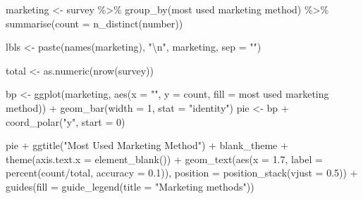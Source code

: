 \documentclass[
]{article}
\newenvironment{Shaded}{\begin{snugshade}}{\end{snugshade}}
\newcommand{\AttributeTok}[1]{\textcolor[rgb]{0.77,0.63,0.00}{#1}}
\newcommand{\DecValTok}[1]{\textcolor[rgb]{0.00,0.00,0.81}{#1}}
\newcommand{\FloatTok}[1]{\textcolor[rgb]{0.00,0.00,0.81}{#1}}
\newcommand{\FunctionTok}[1]{\textcolor[rgb]{0.00,0.00,0.00}{#1}}
\newcommand{\NormalTok}[1]{#1}
\newcommand{\OtherTok}[1]{\textcolor[rgb]{0.56,0.35,0.01}{#1}}
\newcommand{\SpecialCharTok}[1]{\textcolor[rgb]{0.00,0.00,0.00}{#1}}
\newcommand{\StringTok}[1]{\textcolor[rgb]{0.31,0.60,0.02}{#1}}
\begin{document}
\begin{Shaded}
\begin{Highlighting}[]
\NormalTok{marketing }\OtherTok{\textless{}{-}}\NormalTok{ survey }\SpecialCharTok{\%\textgreater{}\%}
    \FunctionTok{group\_by}\NormalTok{(}\StringTok{\textasciigrave{}}\AttributeTok{most used marketing method}\StringTok{\textasciigrave{}}\NormalTok{) }\SpecialCharTok{\%\textgreater{}\%}
    \FunctionTok{summarise}\NormalTok{(}\AttributeTok{count =} \FunctionTok{n\_distinct}\NormalTok{(number))}

\NormalTok{lbls }\OtherTok{\textless{}{-}} \FunctionTok{paste}\NormalTok{(}\FunctionTok{names}\NormalTok{(marketing), }\StringTok{"}\SpecialCharTok{\textbackslash{}n}\StringTok{"}\NormalTok{, marketing, }\AttributeTok{sep =} \StringTok{""}\NormalTok{)}

\NormalTok{total }\OtherTok{\textless{}{-}} \FunctionTok{as.numeric}\NormalTok{(}\FunctionTok{nrow}\NormalTok{(survey))}

\NormalTok{bp }\OtherTok{\textless{}{-}} \FunctionTok{ggplot}\NormalTok{(marketing, }\FunctionTok{aes}\NormalTok{(}\AttributeTok{x =} \StringTok{""}\NormalTok{, }\AttributeTok{y =}\NormalTok{ count, }\AttributeTok{fill =} \StringTok{\textasciigrave{}}\AttributeTok{most used marketing method}\StringTok{\textasciigrave{}}\NormalTok{)) }\SpecialCharTok{+}
    \FunctionTok{geom\_bar}\NormalTok{(}\AttributeTok{width =} \DecValTok{1}\NormalTok{, }\AttributeTok{stat =} \StringTok{"identity"}\NormalTok{)}
\NormalTok{pie }\OtherTok{\textless{}{-}}\NormalTok{ bp }\SpecialCharTok{+} \FunctionTok{coord\_polar}\NormalTok{(}\StringTok{"y"}\NormalTok{, }\AttributeTok{start =} \DecValTok{0}\NormalTok{)}

\NormalTok{pie }\SpecialCharTok{+} \FunctionTok{ggtitle}\NormalTok{(}\StringTok{"Most Used Marketing Method"}\NormalTok{) }\SpecialCharTok{+}\NormalTok{ blank\_theme }\SpecialCharTok{+} \FunctionTok{theme}\NormalTok{(}\AttributeTok{axis.text.x =} \FunctionTok{element\_blank}\NormalTok{()) }\SpecialCharTok{+}
    \FunctionTok{geom\_text}\NormalTok{(}\FunctionTok{aes}\NormalTok{(}\AttributeTok{x =} \FloatTok{1.7}\NormalTok{, }\AttributeTok{label =} \FunctionTok{percent}\NormalTok{(count}\SpecialCharTok{/}\NormalTok{total, }\AttributeTok{accuracy =} \FloatTok{0.1}\NormalTok{)),}
        \AttributeTok{position =} \FunctionTok{position\_stack}\NormalTok{(}\AttributeTok{vjust =} \FloatTok{0.5}\NormalTok{)) }\SpecialCharTok{+} \FunctionTok{guides}\NormalTok{(}\AttributeTok{fill =} \FunctionTok{guide\_legend}\NormalTok{(}\AttributeTok{title =} \StringTok{"Marketing methods"}\NormalTok{))}
\end{Highlighting}
\end{Shaded}
\end{document}
